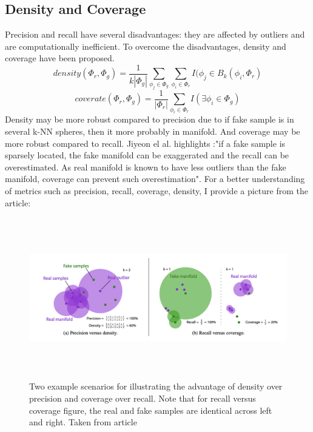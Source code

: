 \subsection{Density and Coverage}
Precision and recall have several disadvantages: they are affected by outliers and are computationally inefficient. To overcome the disadvantages, density and coverage have been proposed\cite{Coverage_Density}.
\begin{equation}
density(\Phi_r,\Phi_g)=\frac{1}{k|\Phi_g|}\sum\limits_{\phi_j\in\Phi_g}\sum\limits_{\phi_i\in\Phi_r}I(\phi_j\in B_k(\phi_i,\Phi_r)
\end{equation}
\begin{equation}
coverate(\Phi_r,\Phi_g)=\frac{1}{|\Phi_r|}\sum\limits_{\phi_i\in\Phi_r}I(\exists\phi_i\in\Phi_g)
\end{equation}
Density may be more robust compared to precision due to if fake sample is in several k-NN spheres, then it more probably in manifold. 
And coverage may be more robust compared to recall. Jiyeon el al. highlights :"if a fake sample is sparsely located, the fake manifold can be exaggerated and the recall can be overestimated. As real manifold is known to have less outliers than the fake manifold, coverage can prevent such overestimation"\cite[p.3]{RarityScore}.
For a better understanding of metrics such as precision, recall, coverage, density, I provide a picture from the article\cite{Coverage_Density}:
\begin{figure}[hbt]
\centering
\includegraphics[width=15cm, height=7cm]{figs/precision_recall_coverage_density.png}
\caption{Two example scenarios for illustrating the advantage of density over precision and coverage over recall.
Note that for recall versus coverage figure, the real and fake samples are identical across left and right. Taken from article\cite{Coverage_Density}}
\label{fig:PrecisionRecallCoverageDensity}
\end{figure}
